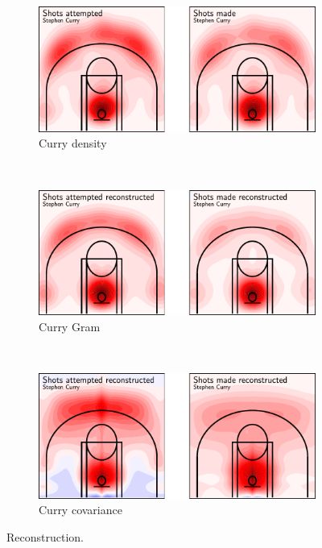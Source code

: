 \begin{figure}
    \centering
    \begin{subfigure}[b]{0.45\textwidth}
        \centering
        \includegraphics[width=\textwidth]{figures/curry_density.pdf}
        \caption{Curry density}
        \label{fig:curry_density}
    \end{subfigure}
    \\
    \begin{subfigure}[b]{0.45\textwidth}
        \centering
        \includegraphics[width=\textwidth]{figures/curry_gram.pdf}
        \caption{Curry Gram}
        \label{fig:curry_gram}
    \end{subfigure}
    \\
    \begin{subfigure}[b]{0.45\textwidth}
        \centering
        \includegraphics[width=\textwidth]{figures/curry_covariance.pdf}
        \caption{Curry covariance}
        \label{fig:curry_covariance}
    \end{subfigure}
    \caption{Reconstruction.}
    \label{fig:reconstruction}
\end{figure}
